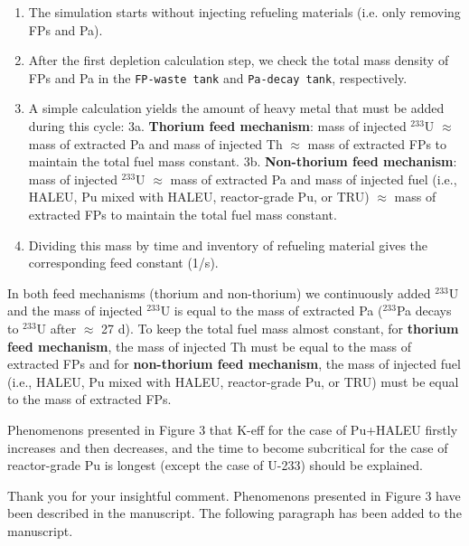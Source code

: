 \documentclass[answers,11pt]{exam}
\begin{document}
\begin{questions}
\begin{solution}
               \begin{enumerate}
               	\item The simulation starts without injecting refueling materials (i.e. only removing FPs and Pa).
               	\item After the first depletion calculation step, we check the total mass density of FPs and Pa in the \texttt{FP-waste tank} and \texttt{Pa-decay tank}, respectively.
               	\item A simple calculation yields the amount of heavy metal that must be added during this cycle:
               	\subitem 3a. \textbf{Thorium feed mechanism}: mass of injected $^{233}$U $\approx$ mass of extracted Pa and mass of injected Th $\approx$ mass of extracted FPs to maintain the total fuel mass constant.
               	\subitem 3b. \textbf{Non-thorium feed mechanism}: mass of injected $^{233}$U $\approx$ mass of extracted Pa and mass of injected fuel (i.e., HALEU, Pu mixed with HALEU, reactor-grade Pu, or TRU) $\approx$ mass of extracted FPs to maintain the total fuel mass constant.
               	\item Dividing this mass by time and inventory of refueling material gives the corresponding feed constant (1/s).
               \end{enumerate}
               In both feed mechanisms (thorium and non-thorium) we continuously added $^{233}$U and the mass of injected $^{233}$U is equal to the mass of extracted Pa ($^{233}$Pa decays to $^{233}$U after $\approx$ 27 d). To keep the total fuel mass almost constant, for \textbf{thorium feed mechanism}, the mass of injected Th must be equal to the mass of extracted FPs and for \textbf{non-thorium feed mechanism}, the mass of injected fuel (i.e., HALEU, Pu mixed with HALEU, reactor-grade Pu, or TRU) must be equal to the mass of extracted FPs.
               
        \end{solution}


        \question Phenomenons presented in Figure 3 that K-eff for the case of Pu+HALEU firstly increases and then decreases, and the time to become subcritical for the case of reactor-grade Pu is longest (except the case of U-233) should be explained.
        \begin{solution}
                 Thank you for your insightful comment. Phenomenons presented 
                 in Figure 3 have been described in the manuscript.
                 The following paragraph has been added to the manuscript.\\
                 

\end{solution}
\end{questions}
\end{document}
